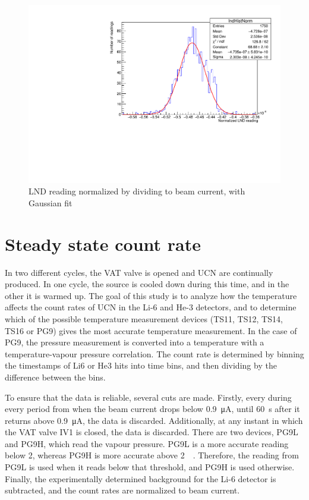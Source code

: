 \documentclass[10pt,letterpaper]{article}
\begin{document}
\begin{figure}
\centering
\includegraphics[width=\textwidth,page=1]{../thermal_neutron_detector/lndHist.pdf}
\caption{LND reading normalized by dividing to beam current, with Gaussian fit}
\label{fig:LNDhist}
\end{figure}



\section{Steady state count rate}

In two different cycles, the VAT valve is opened and UCN are continually produced. In one cycle, the source is cooled down during this time, and in the other it is warmed up. The goal of this study is to analyze how the temperature affects the count rates of UCN in the Li-6 and He-3 detectors, and to determine which of the possible temperature measurement devices (TS11, TS12, TS14, TS16 or PG9) gives the most accurate temperature measurement. In the case of PG9, the pressure measurement is converted into a temperature with a temperature-vapour pressure correlation. The count rate is determined by binning the timestamps of Li6 or He3 hits into time bins, and then dividing by the difference between the bins.

To ensure that the data is reliable, several cuts are made. Firstly, every during every period from when the beam current drops below \SI{0.9}{\micro\ampere}, until \SI{60}{\second} after it returns above \SI{0.9}{\micro\ampere}, the data is discarded. Additionally, at any instant in which the VAT valve IV1 is closed, the data is discarded. There are two devices, PG9L and PG9H, which read the vapour pressure. PG9L is a more accurate reading below \SI{2}{\torr}, whereas PG9H is more accurate above \SI{2}{\milli\torr}. Therefore, the reading from PG9L is used when it reads below that threshold, and PG9H is used otherwise. Finally, the experimentally determined background for the Li-6 detector is subtracted, and the count rates are normalized to beam current.
\end{document}
